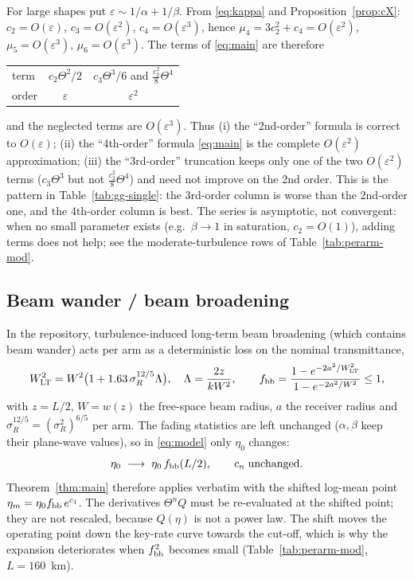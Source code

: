 \documentclass[11pt,a4paper]{article}
\theoremstyle{plain}
\theoremstyle{remark}
\begin{document}
For large shapes put $\varepsilon\sim1/\alpha+1/\beta$. From \eqref{eq:kappa} and Proposition~\ref{prop:cX}: $c_2=O(\varepsilon)$, $c_3=O(\varepsilon^{2})$, $c_4=O(\varepsilon^{3})$, hence $\mu_4=3c_2^2+c_4=O(\varepsilon^{2})$, $\mu_5=O(\varepsilon^{3})$, $\mu_6=O(\varepsilon^{3})$. The terms of \eqref{eq:main} are therefore
\begin{center}
\begin{tabular}{lcc}
\toprule
term & $c_2\Theta^2/2$ & $c_3\Theta^3/6$ \;and\; $\tfrac{c_2^2}{8}\Theta^4$ \\
order & $\varepsilon$ & $\varepsilon^{2}$ \\
\bottomrule
\end{tabular}
\end{center}
and the neglected terms are $O(\varepsilon^{3})$. Thus (i) the ``2nd-order'' formula is correct to $O(\varepsilon)$; (ii) the ``4th-order'' formula \eqref{eq:main} is the complete $O(\varepsilon^{2})$ approximation; (iii) the ``3rd-order'' truncation keeps only one of the two $O(\varepsilon^{2})$ terms ($c_3\Theta^3$ but not $\tfrac{c_2^2}{8}\Theta^4$) and need not improve on the 2nd order. This is the pattern in Table~\ref{tab:gg-single}: the 3rd-order column is worse than the 2nd-order one, and the 4th-order column is best. The series is asymptotic, not convergent: when no small parameter exists (e.g.\ $\beta\to1$ in saturation, $c_2=O(1)$), adding terms does not help; see the moderate-turbulence rows of Table~\ref{tab:perarm-mod}.

\subsection{Beam wander / beam broadening}
\label{sec:bb}

In the repository, turbulence-induced long-term beam broadening (which contains beam wander) acts per arm as a deterministic loss on the nominal transmittance,
\begin{equation}
  W_{\rm LT}^2=W^2\big(1+1.63\,\sigma_R^{12/5}\Lambda\big),\quad \Lambda=\frac{2z}{kW^2},\qquad
  f_{\rm bb}=\frac{1-e^{-2a^2/W_{\rm LT}^2}}{1-e^{-2a^2/W^2}}\le1,
\end{equation}
with $z=L/2$, $W=w(z)$ the free-space beam radius, $a$ the receiver radius and $\sigma_R^{12/5}=(\sigma_R^2)^{6/5}$ per arm. The fading statistics are left unchanged ($\alpha,\beta$ keep their plane-wave values), so in \eqref{eq:model} only $\eta_0$ changes:
\begin{equation}
  \eta_0\;\longrightarrow\;\eta_0\,f_{\rm bb}(L/2),\qquad c_n\;\text{unchanged}.
\end{equation}
Theorem~\ref{thm:main} therefore applies verbatim with the shifted log-mean point $\eta_m=\eta_0f_{\rm bb}\,e^{c_1}$. The derivatives $\Theta^nQ$ must be re-evaluated at the shifted point; they are not rescaled, because $Q(\eta)$ is not a power law. The shift moves the operating point down the key-rate curve towards the cut-off, which is why the expansion deteriorates when $f_{\rm bb}^2$ becomes small (Table~\ref{tab:perarm-mod}, $L=160$~km).
\end{document}
